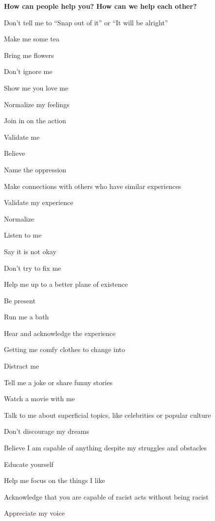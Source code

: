 \noindent\textcolor{ProcessBlue}{\textbf{\Large{How can people help you?}}}
\noindent\textcolor{ProcessBlue}{\textbf{\Large{How can we help each other?}}}\\
\begin{multicols}{2}
\begin{checkboxlist}
\item Don’t tell me to “Snap out of it” or “It will be alright”
\item Make me some tea
\item Bring me flowers
\item Don’t ignore me
\item Show me you love me
\item Normalize my feelings
\item Join in on the action
\item Validate me
\item Believe
\item Name the oppression
\item Make connections with others who have similar experiences
\item Validate my experience
\item Normalize
\item Listen to me
\item Say it is not okay
\item Don’t try to fix me
\item Help me up to a better plane of existence
\item Be present
\item Run me a bath
\item Hear and acknowledge the experience
\item Getting me comfy clothes to change into
\item Distract me
\item Tell me a joke or share funny stories
\item Watch a movie with me
\item Talk to me about superficial topics, like celebrities or popular culture
\item Don’t discourage my dreams
\item Believe I am capable of anything despite my struggles and obstacles
\item Educate yourself
\item Help me focus on the things I like
\item Acknowledge that you are capable of racist acts without being racist
\item Appreciate my voice

\end{checkboxlist}
\end{multicols}
